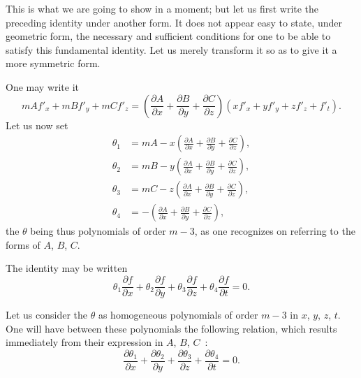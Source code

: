 \documentclass{article}
\begin{document}
This is what we are going to show in a moment; but let us first write the preceding identity under another form. It does not appear easy to state, under geometric form, the necessary and sufficient conditions for one to be able to satisfy this fundamental identity. Let us merely transform it so as to give it a more symmetric form.

One may write it
\[
m A f'_{x} + m B f'_{y} + m C f'_{z} = \left( \frac{\partial A}{\partial x} + \frac{\partial B}{\partial y} + \frac{\partial C}{\partial z} \right) (x f'_{x} + y f'_{y} + z f'_{z} + f'_{t}).
\]
Let us now set
\[
\begin{aligned}
\theta_{1} &= m A - x \left( \frac{\partial A}{\partial x} + \frac{\partial B}{\partial y} + \frac{\partial C}{\partial z} \right), \\
\theta_{2} &= m B - y \left( \frac{\partial A}{\partial x} + \frac{\partial B}{\partial y} + \frac{\partial C}{\partial z} \right), \\
\theta_{3} &= m C - z \left( \frac{\partial A}{\partial x} + \frac{\partial B}{\partial y} + \frac{\partial C}{\partial z} \right), \\
\theta_{4} &= - \left( \frac{\partial A}{\partial x} + \frac{\partial B}{\partial y} + \frac{\partial C}{\partial z} \right),
\end{aligned}
\]
the $\theta$ being thus polynomials of order $m - 3$, as one recognizes on referring to the forms of $A$, $B$, $C$.

The identity may be written
\[
\theta_{1} \frac{\partial f}{\partial x} + \theta_{2} \frac{\partial f}{\partial y} + \theta_{3} \frac{\partial f}{\partial z} + \theta_{4} \frac{\partial f}{\partial t} = 0. \tag{1}
\]

Let us consider the $\theta$ as homogeneous polynomials of order $m - 3$ in $x$, $y$, $z$, $t$. One will have between these polynomials the following relation, which results immediately from their expression in $A$, $B$, $C$~:
\[
\frac{\partial \theta_{1}}{\partial x} + \frac{\partial \theta_{2}}{\partial y} + \frac{\partial \theta_{3}}{\partial z} + \frac{\partial \theta_{4}}{\partial t} = 0.
\]
\end{document}
